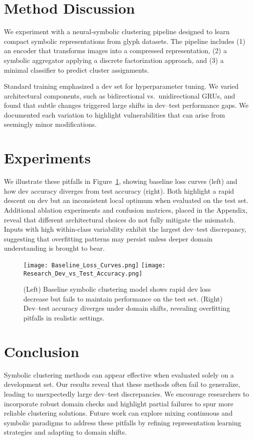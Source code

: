 \documentclass[11pt]{article}
\begin{document}
\section{Method Discussion}
We experiment with a neural-symbolic clustering pipeline designed to learn compact symbolic representations from glyph datasets. The pipeline includes (1) an encoder that transforms images into a compressed representation, (2) a symbolic aggregator applying a discrete factorization approach, and (3) a minimal classifier to predict cluster assignments.

Standard training emphasized a dev set for hyperparameter tuning. We varied architectural components, such as bidirectional vs.\ unidirectional GRUs, and found that subtle changes triggered large shifts in dev--test performance gaps. We documented each variation to highlight vulnerabilities that can arise from seemingly minor modifications.

\section{Experiments}
We illustrate these pitfalls in Figure~\ref{fig:mainfigure}, showing baseline loss curves (left) and how dev accuracy diverges from test accuracy (right). Both highlight a rapid descent on dev but an inconsistent local optimum when evaluated on the test set. Additional ablation experiments and confusion matrices, placed in the Appendix, reveal that different architectural choices do not fully mitigate the mismatch. Inputs with high within-class variability exhibit the largest dev--test discrepancy, suggesting that overfitting patterns may persist unless deeper domain understanding is brought to bear.

\begin{figure}[t]
\centering
\texttt{[image: Baseline\_Loss\_Curves.png]}
\hfill
\texttt{[image: Research\_Dev\_vs\_Test\_Accuracy.png]}
\caption{(Left) Baseline symbolic clustering model shows rapid dev loss decrease but fails to maintain performance on the test set. (Right) Dev--test accuracy diverges under domain shifts, revealing overfitting pitfalls in realistic settings.}
\label{fig:mainfigure}
\end{figure}

\section{Conclusion}
Symbolic clustering methods can appear effective when evaluated solely on a development set. Our results reveal that these methods often fail to generalize, leading to unexpectedly large dev--test discrepancies. We encourage researchers to incorporate robust domain checks and highlight partial failures to spur more reliable clustering solutions. Future work can explore mixing continuous and symbolic paradigms to address these pitfalls by refining representation learning strategies and adapting to domain shifts.
\end{document}
